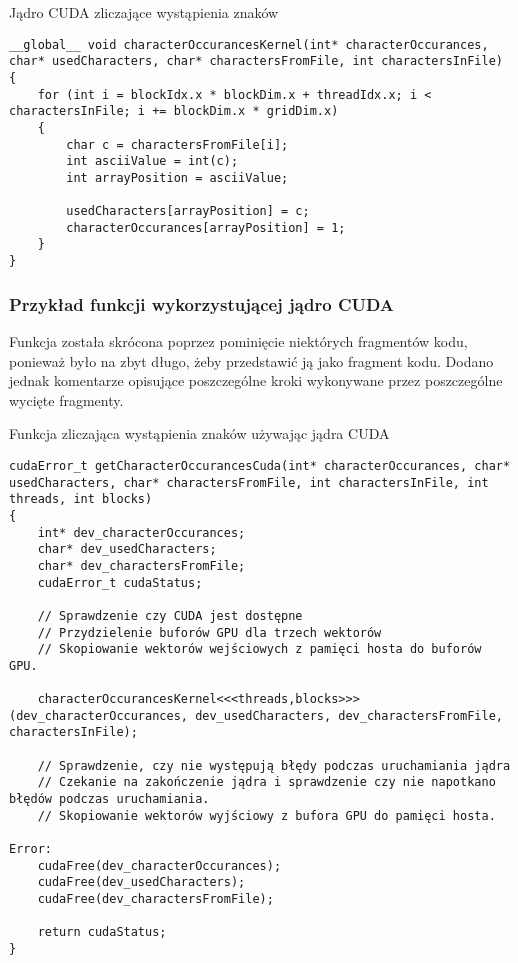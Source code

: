 \documentclass[12pt,a4paper,titlepage]{article}
\begin{document}
\begin{listing}[H]
\caption{Jądro CUDA zliczające wystąpienia znaków}
\begin{verbatim}
__global__ void characterOccurancesKernel(int* characterOccurances, char* usedCharacters, char* charactersFromFile, int charactersInFile)
{
    for (int i = blockIdx.x * blockDim.x + threadIdx.x; i < charactersInFile; i += blockDim.x * gridDim.x)
    {
        char c = charactersFromFile[i];
        int asciiValue = int(c);
        int arrayPosition = asciiValue;

        usedCharacters[arrayPosition] = c;
        characterOccurances[arrayPosition] = 1;
    }
}
\end{verbatim}
\end{listing}

\subsubsection{Przykład funkcji wykorzystującej jądro CUDA}
Funkcja została skrócona poprzez pominięcie niektórych fragmentów kodu, ponieważ było na zbyt długo, żeby przedstawić ją jako fragment kodu. Dodano jednak komentarze opisujące poszczególne kroki wykonywane przez poszczególne wycięte fragmenty.

\begin{listing}[H]
\caption{Funkcja zliczająca wystąpienia znaków używając jądra CUDA}
\begin{verbatim}
cudaError_t getCharacterOccurancesCuda(int* characterOccurances, char* usedCharacters, char* charactersFromFile, int charactersInFile, int threads, int blocks)
{
    int* dev_characterOccurances;
    char* dev_usedCharacters;
    char* dev_charactersFromFile;
    cudaError_t cudaStatus;
	
    // Sprawdzenie czy CUDA jest dostępne
    // Przydzielenie buforów GPU dla trzech wektorów
    // Skopiowanie wektorów wejściowych z pamięci hosta do buforów GPU.
    
    characterOccurancesKernel<<<threads,blocks>>>(dev_characterOccurances, dev_usedCharacters, dev_charactersFromFile, charactersInFile);

    // Sprawdzenie, czy nie występują błędy podczas uruchamiania jądra
    // Czekanie na zakończenie jądra i sprawdzenie czy nie napotkano błędów podczas uruchamiania.
    // Skopiowanie wektorów wyjściowy z bufora GPU do pamięci hosta.

Error:
    cudaFree(dev_characterOccurances);
    cudaFree(dev_usedCharacters);
    cudaFree(dev_charactersFromFile);

    return cudaStatus;
}
\end{verbatim}
\end{listing}
\end{document}
